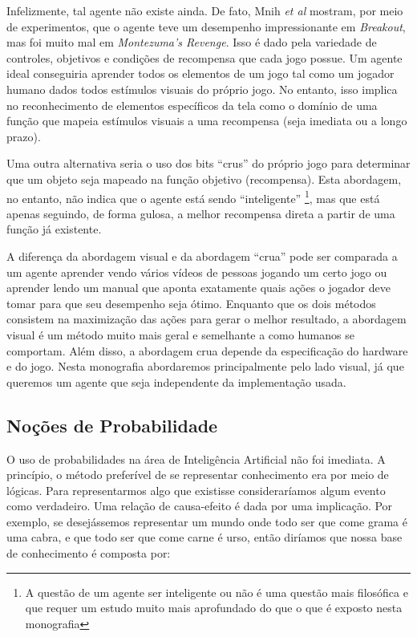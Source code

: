 \documentclass[a4paper,10pt]{article}
\theoremstyle{plain}
\begin{document}
Infelizmente, tal agente não existe ainda. De fato, Mnih \textit{et al}\cite{mnih-et-al} mostram,
por meio de experimentos, que o agente teve um desempenho impressionante em \textit{Breakout},
mas foi muito mal em \textit{Montezuma's Revenge}. Isso é dado pela variedade de controles,
objetivos e condições de recompensa que cada jogo possue. Um agente ideal conseguiria aprender
todos os elementos de um jogo tal como um jogador humano dados todos estímulos visuais do próprio
jogo. No entanto, isso implica no reconhecimento de elementos específicos da tela como o domínio
de uma função que mapeia estímulos visuais a uma recompensa (seja imediata ou a longo prazo).

Uma outra alternativa seria o uso dos bits ``crus'' do próprio jogo para determinar que um objeto
seja mapeado na função objetivo (recompensa). Esta abordagem, no entanto, não indica que o agente
está sendo ``inteligente'' \footnote{A questão de um agente ser inteligente ou não é uma questão
mais filosófica e que requer um estudo muito mais aprofundado do que o que é exposto nesta
monografia}, mas que está apenas seguindo, de forma gulosa, a melhor recompensa direta a partir
de uma função já existente.

A diferença da abordagem visual e da abordagem ``crua'' pode ser comparada a um agente aprender
vendo vários vídeos de pessoas jogando um certo jogo ou aprender lendo um manual que aponta
exatamente quais ações o jogador deve tomar para que seu desempenho seja ótimo. Enquanto que os
dois métodos consistem na maximização das ações para gerar o melhor resultado, a abordagem visual
é um método muito mais geral e semelhante a como humanos se comportam. Além disso, a abordagem
crua depende da especificação do hardware e do jogo. Nesta monografia abordaremos principalmente
pelo lado visual, já que queremos um agente que seja independente da implementação usada.

\subsection*{Noções de Probabilidade}

O uso de probabilidades na área de Inteligência Artificial não foi imediata. A princípio, o método
preferível de se representar conhecimento era por meio de lógicas. Para representarmos algo que
existisse consideraríamos algum evento como verdadeiro. Uma relação de causa-efeito é dada por uma
implicação. Por exemplo, se desejássemos representar um mundo onde todo ser que come grama é uma
cabra, e que todo ser que come carne é urso, então diríamos que nossa base de conhecimento é
composta por:
\end{document}
